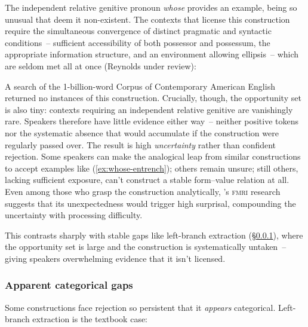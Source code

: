\documentclass[12pt,letterpaper]{article}
\newcommand{\mention}[1]{\textit{#1}}
\newcommand{\abbr}[1]{\textsc{#1}}
\begin{document}
The independent relative genitive pronoun \mention{whose} provides an example, being so unusual that \textcite{hankamer1973whose} deem it non-existent. The contexts that license this construction require the simultaneous convergence of distinct pragmatic and syntactic conditions~--  sufficient accessibility of both possessor and possessum, the appropriate information structure, and an environment allowing ellipsis~--  which are seldom met all at once (Reynolds under review):

\z

A search of the 1-billion-word Corpus of Contemporary American English returned no instances of this construction. Crucially, though, the opportunity set is also tiny: contexts requiring an independent relative genitive are vanishingly rare. Speakers therefore have little evidence either way~-- neither positive tokens nor the systematic absence that would accumulate if the construction were regularly passed over. The result is high \emph{uncertainty} rather than confident rejection. Some speakers can make the analogical leap from similar constructions to accept examples like (\ref{ex:whose-entrench}); others remain unsure; still others, lacking sufficient exposure, can't construct a stable form--value relation at all. Even among those who grasp the construction analytically, \textcite{shain2020fmri}'s \abbr{fmri} research suggests that its unexpectedness would trigger high surprisal, compounding the uncertainty with processing difficulty.

This contrasts sharply with stable gaps like left-branch extraction (\S\ref{sec:categorical-constraints}), where the opportunity set is large and the construction is systematically untaken~-- giving speakers overwhelming evidence that it isn't licensed.

\subsubsection{Apparent categorical gaps}\label{sec:categorical-constraints}

Some constructions face rejection so persistent that it \emph{appears} categorical. Left-branch extraction is the textbook case:

\label{ex:LBC-cat}
\z
\end{document}
